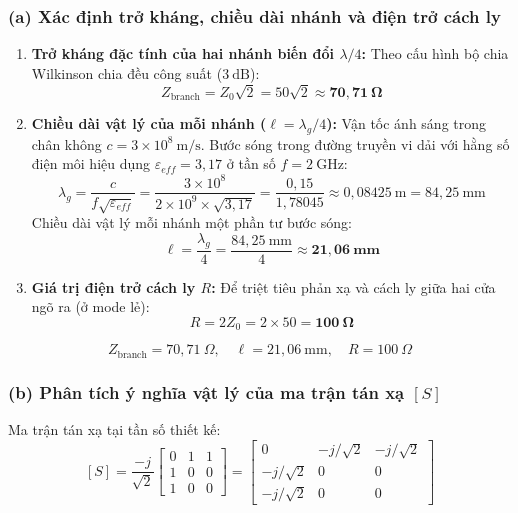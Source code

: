 \documentclass[12pt,a4paper]{article}
\begin{document}
\subsubsection{(a) Xác định trở kháng, chiều dài nhánh và điện trở cách ly}
\begin{enumerate}
    \item \textbf{Trở kháng đặc tính của hai nhánh biến đổi $\lambda/4$:}
    Theo cấu hình bộ chia Wilkinson chia đều công suất ($3~\text{dB}$):
    \[
    Z_{\text{branch}} = Z_0 \sqrt{2} = 50 \sqrt{2} \approx \mathbf{70{,}71~\Omega}
    \]
    \item \textbf{Chiều dài vật lý của mỗi nhánh ($\ell = \lambda_g/4$):}
    Vận tốc ánh sáng trong chân không $c = 3 \times 10^8~\text{m/s}$. Bước sóng trong đường truyền vi dải với hằng số điện môi hiệu dụng $\varepsilon_{eff} = 3{,}17$ ở tần số $f = 2~\text{GHz}$:
    \[
    \lambda_g = \frac{c}{f\sqrt{\varepsilon_{eff}}} = \frac{3 \times 10^8}{2 \times 10^9 \times \sqrt{3{,}17}} = \frac{0{,}15}{1{,}78045} \approx 0{,}08425~\text{m} = 84{,}25~\text{mm}
    \]
    Chiều dài vật lý mỗi nhánh một phần tư bước sóng:
    \[
    \ell = \frac{\lambda_g}{4} = \frac{84{,}25~\text{mm}}{4} \approx \mathbf{21{,}06~\text{mm}}
    \]
    \item \textbf{Giá trị điện trở cách ly $R$:}
    Để triệt tiêu phản xạ và cách ly giữa hai cửa ngõ ra (ở mode lẻ):
    \[
    R = 2 Z_0 = 2 \times 50 = \mathbf{100~\Omega}
    \]
\end{enumerate}
\[
\boxed{Z_{\text{branch}} = 70{,}71~\Omega, \quad \ell = 21{,}06~\text{mm}, \quad R = 100~\Omega}
\]

\subsubsection{(b) Phân tích ý nghĩa vật lý của ma trận tán xạ $[S]$}
Ma trận tán xạ tại tần số thiết kế:
\[
[S] = \frac{-j}{\sqrt{2}} \begin{bmatrix} 0 & 1 & 1 \\ 1 & 0 & 0 \\ 1 & 0 & 0 \end{bmatrix} = \begin{bmatrix} 0 & -j/\sqrt{2} & -j/\sqrt{2} \\ -j/\sqrt{2} & 0 & 0 \\ -j/\sqrt{2} & 0 & 0 \end{bmatrix}
\]
\end{document}
